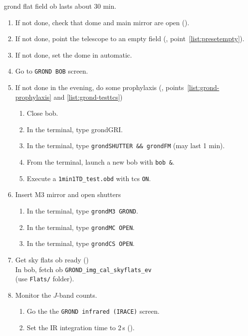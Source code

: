 \documentclass[11pt,fleqn,a4paper]{book}
\begin{document}
\gls{grond} flat field \gls{ob} lasts about 30 min.
\begin{enumerate}
  \item If not done, check that dome and \gls{main mirror} are open ().
  \item If not done, point the telescope to an empty field (, point~\ref{list:presetempty}).
  \item If not done, set the dome in automatic.
  \item Go to \texttt{GROND BOB} screen.
  \item If not done in the evening, do some prophylaxis (, points~\ref{list:grond-prophylaxis} and \ref{list:grond-testtcs})
     \begin{enumerate}
       \item Close \gls{bob}.
       \item In the terminal, type \gls{grondGRI}.
       \item In the terminal, type \texttt{\gls{grondSHUTTER} \&\& \gls{grondFM}} (may last 1 min).
       \item From the terminal, launch a new \gls{bob} with \texttt{bob \&}.
       \item Execute a \texttt{1min1TD\_test.obd} with \gls{tcs} \texttt{ON}.
     \end{enumerate}
  \item Insert \gls{M3} mirror and open shutters
     \begin{enumerate}
       \item In the terminal, type \texttt{\gls{grondM3} GROND}.
       \item In the terminal, type \texttt{\gls{grondMC} OPEN}.
       \item In the terminal, type \texttt{\gls{grondCS} OPEN}.
     \end{enumerate}
  \item Get \gls{sky flats} \gls{ob} ready ()\\
         In \gls{bob}, fetch \gls{ob} \texttt{GROND\_img\_cal\_skyflats\_ev}\\
         (use \texttt{Flats/} folder).
  \item Monitor the $J$-band counts.
        \begin{enumerate}
           \item Go the the \texttt{GROND infrared (IRACE)} screen.
           \item Set the IR integration time to 2\,s ().

\end{enumerate}
\end{enumerate}
\end{document}
